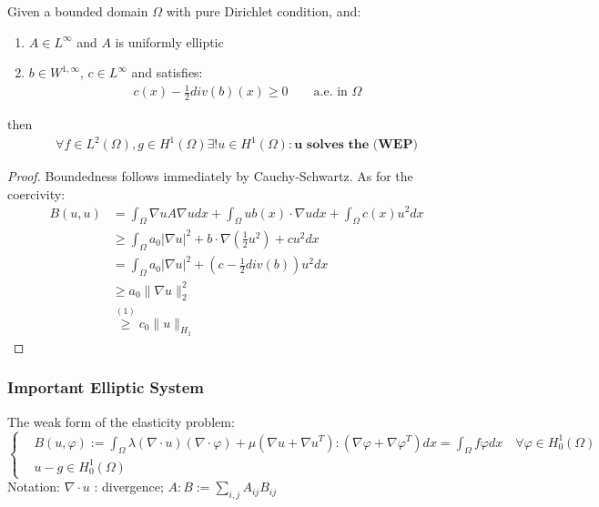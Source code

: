 \begin{theorem}
	  Given a bounded domain $\Omega$ with pure Dirichlet condition, and:
	  \begin{enumerate}
	  	\item $A \in L^\infty$ and $A$ is uniformly elliptic
	  	\item $b \in W^{1, \infty}$, $c \in L^\infty$ and satisfies:
	  	\begin{align*}
	  		c(x) - \frac{1}{2}div(b)(x) \geq 0 \qquad \text{a.e. in $\Omega$}
	  	\end{align*}
	  \end{enumerate}
	  then 
	  \begin{align*}
	  	\forall f \in L^2(\Omega), g \in H^1(\Omega)\exists!u \in H^1(\Omega): \textbf{u solves the (WEP)}
	  \end{align*}
\end{theorem}
\begin{proof}
Boundedness follows immediately by Cauchy-Schwartz. As for the coercivity:
\begin{align*}
	B(u, u) &= \int_\Omega \nabla u A \nabla u dx + \int_\Omega u  b(x) \cdot  \nabla u dx + \int_\Omega c(x) u^2 dx \\
	&\geq \int_\Omega a_0 |\nabla u|^2 + b \cdot \nabla (\frac{1}{2} u^2) + cu^2 dx\\
	&= \int_\Omega a_0 |\nabla u|^2 + (c -\frac{1}{2}div(b))u^2 dx \\
	&\geq a_0 \|\nabla u\|^2_2 \\
	&\overset{(1)}{\geq} c_0 \|u\|_{H_1} 
\end{align*}
\end{proof}

\subsubsection*{Important Elliptic System}
The weak form of the elasticity problem:
\begin{equation}
\left\{
\begin{aligned}
	&B(u, \varphi) := \int_\Omega \lambda (\nabla \cdot u)(\nabla \cdot \varphi) + \mu (\nabla u + \nabla u^T) :(\nabla \varphi + \nabla \varphi^T)dx = \int_\Omega f \varphi dx \quad \forall \varphi \in H^1_0(\Omega) \\
	&u - g \in H^1_0(\Omega)
\end{aligned}	
\right.
\end{equation}
Notation: $\nabla \cdot u$ : divergence; $A:B := \sum_{i,j} A_{ij}B_{ij}$



